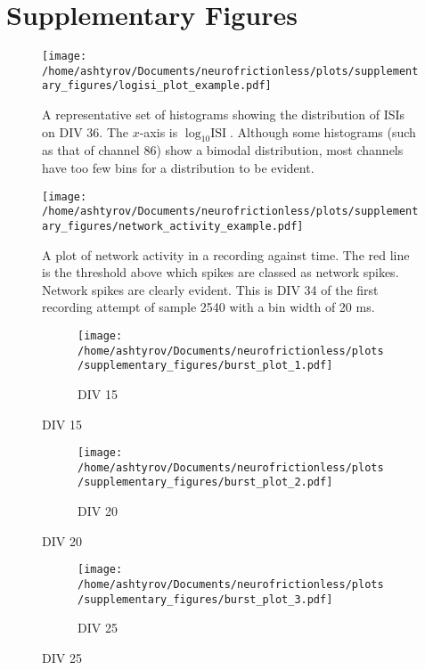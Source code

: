 \documentclass[10pt]{article}
\begin{document}



\pagebreak

\section{Supplementary Figures}
\setcounter{figure}{0}
\renewcommand{\thefigure}{S\arabic{figure}}

\begin{figure}[h!]
	\centering
	\texttt{[image: /home/ashtyrov/Documents/neurofrictionless/plots/supplementary\_figures/logisi\_plot\_example.pdf]}
	\caption{A representative set of histograms showing the distribution of ISIs on DIV 36. The \(x\)-axis is \(\log_{10} \text{ISI}\). Although some histograms (such as that of channel 86) show a bimodal distribution, most channels have too few bins for a distribution to be evident.}
	\label{fig:histograms}
\end{figure}

\begin{figure}[h!]
	\centering
	\texttt{[image: /home/ashtyrov/Documents/neurofrictionless/plots/supplementary\_figures/network\_activity\_example.pdf]}
	\caption{A plot of network activity in a recording against time. The red line is the threshold above which spikes are classed as network spikes. Network spikes are clearly evident. This is DIV 34 of the first recording attempt of sample 2540 with a bin width of 20 ms.}
	\label{fig:networkact}
\end{figure}

\begin{figure}[h!]
\begin{subfigure}{\textwidth}
	\centering
	\texttt{[image: /home/ashtyrov/Documents/neurofrictionless/plots/supplementary\_figures/burst\_plot\_1.pdf]}
	\caption{DIV 15}
\end{subfigure}
\end{figure}

\begin{figure}[h!]
\ContinuedFloat
\begin{subfigure}{\textwidth}
	\centering
	\texttt{[image: /home/ashtyrov/Documents/neurofrictionless/plots/supplementary\_figures/burst\_plot\_2.pdf]}
	\caption{DIV 20}
\end{subfigure}
\end{figure}

\begin{figure}[h!]
\ContinuedFloat
\begin{subfigure}{\textwidth}
	\centering
	\texttt{[image: /home/ashtyrov/Documents/neurofrictionless/plots/supplementary\_figures/burst\_plot\_3.pdf]}
	\caption{DIV 25}
\end{subfigure}
\end{figure}
\end{document}
